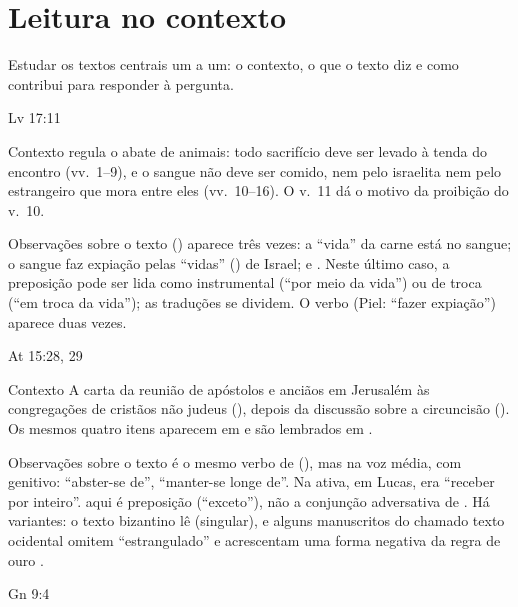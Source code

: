 \chapter{Leitura no contexto}

\begin{objetivo}
Estudar os textos centrais um a um: o contexto, o que o texto diz e como
contribui para responder à pergunta.
\end{objetivo}

\begin{fichatexto}{Lv 17:11}
\begin{campo}{Contexto}
 regula o abate de animais: todo sacrifício deve ser levado à
tenda do encontro (vv.~1–9), e o sangue não deve ser comido, nem pelo
israelita nem pelo estrangeiro que mora entre eles (vv.~10–16). O v.~11 dá o
motivo da proibição do v.~10.
\end{campo}


\begin{campo}{Observações sobre o texto}
 () aparece três vezes: a \enquote{vida} da carne está no
sangue; o sangue faz expiação pelas \enquote{vidas} () de
Israel; e . Neste último caso, a preposição  pode ser
lida como instrumental (\enquote{por meio da vida}) ou de troca
(\enquote{em troca da vida}); as traduções se dividem. O verbo 
(Piel: \enquote{fazer expiação}) aparece duas vezes.
\end{campo}

\end{fichatexto}

\begin{fichatexto}{At 15:28, 29}
\begin{campo}{Contexto}
A carta da reunião de apóstolos e anciãos em Jerusalém às congregações de
cristãos não judeus (), depois da discussão sobre a
circuncisão (). Os mesmos quatro itens aparecem em  e
são lembrados em .
\end{campo}


\begin{campo}{Observações sobre o texto}
 é o mesmo verbo de  (), mas na voz
média, com genitivo: \enquote{abster-se de}, \enquote{manter-se longe de}. Na
ativa, em Lucas, era \enquote{receber por inteiro}.  aqui é
preposição (\enquote{exceto}), não a conjunção adversativa de .
Há variantes: o texto bizantino lê  (singular), e alguns
manuscritos do chamado texto ocidental omitem \enquote{estrangulado} e
acrescentam uma forma negativa da regra de ouro \parencite{metzger1994}.
\end{campo}

\end{fichatexto}

\begin{fichatexto}{Gn 9:4}
\end{fichatexto}
